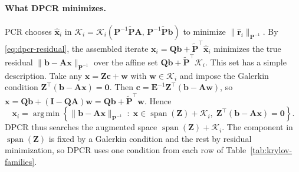 \paragraph{What DPCR minimizes.}
PCR chooses $\hat{\mathbf{x}}_i$ in
$\mathcal{K}_i = \mathcal{K}_i(\mathbf{P}^{-1}\tilde{\mathbf{P}}\mathbf{A},\, \mathbf{P}^{-1}\tilde{\mathbf{P}}\mathbf{b})$
to minimize $\|\hat{\mathbf{r}}_i\|_{\mathbf{P}^{-1}}$. By
\eqref{eq:dpcr-residual}, the assembled iterate
$\mathbf{x}_i = \mathbf{Q}\mathbf{b} + \tilde{\mathbf{P}}^\top\hat{\mathbf{x}}_i$
minimizes the true residual $\|\mathbf{b} - \mathbf{A}\mathbf{x}\|_{\mathbf{P}^{-1}}$
over the affine set $\mathbf{Q}\mathbf{b} + \tilde{\mathbf{P}}^\top\mathcal{K}_i$.
This set has a simple description. Take any
$\mathbf{x} = \mathbf{Z}\mathbf{c} + \mathbf{w}$ with $\mathbf{w} \in \mathcal{K}_i$
and impose the Galerkin condition $\mathbf{Z}^\top(\mathbf{b} - \mathbf{A}\mathbf{x}) = \mathbf{0}$.
Then $\mathbf{c} = \mathbf{E}^{-1}\mathbf{Z}^\top(\mathbf{b} - \mathbf{A}\mathbf{w})$,
so $\mathbf{x} = \mathbf{Q}\mathbf{b} + (\mathbf{I} - \mathbf{Q}\mathbf{A})\mathbf{w}
= \mathbf{Q}\mathbf{b} + \tilde{\mathbf{P}}^\top\mathbf{w}$. Hence
\begin{equation}
  \mathbf{x}_i = \operatorname*{arg\,min}
  \left\{ \|\mathbf{b} - \mathbf{A}\mathbf{x}\|_{\mathbf{P}^{-1}} \;:\;
  \mathbf{x} \in \operatorname{span}(\mathbf{Z}) + \mathcal{K}_i,\;
  \mathbf{Z}^\top(\mathbf{b} - \mathbf{A}\mathbf{x}) = \mathbf{0} \right\} .
  \label{eq:dpcr-minimization}
\end{equation}
DPCR thus searches the augmented space $\operatorname{span}(\mathbf{Z}) + \mathcal{K}_i$.
The component in $\operatorname{span}(\mathbf{Z})$ is fixed by a Galerkin
condition and the rest by residual minimization, so DPCR uses one condition
from each row of Table~\ref{tab:krylov-families}.

